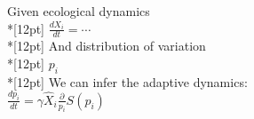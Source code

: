 \documentclass{article}
\begin{document}
\noindent
Given ecological dynamics
\\*[12pt]
\indent
\(
 \frac{dX_i}{dt} = \cdots
\)
\\*[12pt]
\noindent
And distribution of variation
\\*[12pt]
\indent
\(
 p_i
\)
\\*[12pt]
\noindent
We can infer the adaptive dynamics:
\\[12pt]
\indent
\(
 \frac{dp_i}{dt} = \gamma \hat{X}_i \frac{\partial}{p_i} S(p_i)
\)
\end{document}

